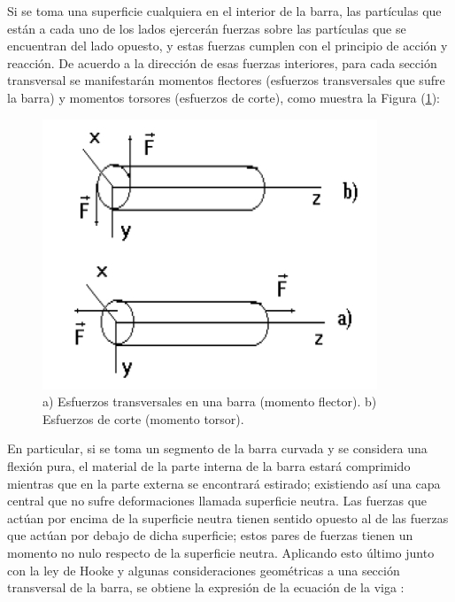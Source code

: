 \documentclass[twoside,twocolumn,a4paper]{article}
\begin{document}
Si se toma una superficie cualquiera en el interior de la barra, las part\'iculas que est\'an a cada uno de los lados ejercer\'an fuerzas sobre las part\'iculas que se encuentran del lado opuesto, y estas fuerzas cumplen con el principio de acci\'on y reacci\'on. De acuerdo a la direcci\'on de esas fuerzas interiores, para cada secci\'on transversal se manifestar\'an momentos flectores (esfuerzos transversales que sufre la barra) y momentos torsores (esfuerzos de corte), como muestra la Figura (\ref{fig:momentos}):

\begin{figure}[H]
\includegraphics[width=\linewidth]{momentos.jpg}
\caption{a) Esfuerzos transversales en una barra (momento flector). b) Esfuerzos de corte (momento torsor).}
\label{fig:momentos}
\end{figure}

En particular, si se toma un segmento de la barra curvada y se considera una flexi\'on pura, el material de la parte interna de la barra estar\'a comprimido mientras que en la parte externa se encontrar\'a estirado; existiendo as\'i una capa central que no sufre deformaciones llamada superficie neutra. Las fuerzas que act\'uan por encima de la superficie neutra tienen sentido opuesto al de las fuerzas que act\'uan por debajo de dicha superficie; estos pares de fuerzas tienen un momento no nulo respecto de la superficie neutra.	Aplicando esto \'ultimo junto con la ley de Hooke y algunas consideraciones geom\'etricas a una secci\'on transversal de la barra, se obtiene la expresi\'on de la ecuaci\'on de la viga \cite{eq:viga}:
\end{document}
